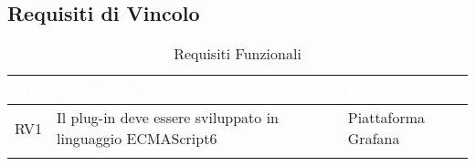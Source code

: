 \subsection{Requisiti di Vincolo}\label{RV}
\begin{center}
\begin{longtable}[c]{|m{}|m{}|m{}|}
\hline
\rowcolor{bluelogo}\textbf{\textcolor{white}{ID}} & \textbf{\textcolor{white}{Descrizione}} & \textbf{\textcolor{white}{Fonti}}\\
\hline \hline
\endfirsthead
RV1 & Il plug-in deve essere sviluppato in linguaggio ECMAScript6 & Piattaforma Grafana\\
\hline
\caption{Requisiti Funzionali}
\end{longtable}
\end{center}